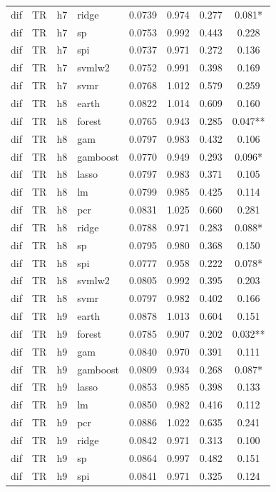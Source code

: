 \begin{ThreePartTable}
\begin{longtable}[t]{llclcccc}
dif & TR & h7 & ridge & 0.0739 & 0.974 & 0.277 & 0.081*\\
dif & TR & h7 & sp & 0.0753 & 0.992 & 0.443 & 0.228\\
dif & TR & h7 & spi & 0.0737 & 0.971 & 0.272 & 0.136\\
dif & TR & h7 & svmlw2 & 0.0752 & 0.991 & 0.398 & 0.169\\
dif & TR & h7 & svmr & 0.0768 & 1.012 & 0.579 & 0.259\\
\addlinespace
dif & TR & h8 & earth & 0.0822 & 1.014 & 0.609 & 0.160\\
dif & TR & h8 & forest & 0.0765 & 0.943 & 0.285 & 0.047**\\
dif & TR & h8 & gam & 0.0797 & 0.983 & 0.432 & 0.106\\
dif & TR & h8 & gamboost & 0.0770 & 0.949 & 0.293 & 0.096*\\
dif & TR & h8 & lasso & 0.0797 & 0.983 & 0.371 & 0.105\\
dif & TR & h8 & lm & 0.0799 & 0.985 & 0.425 & 0.114\\
dif & TR & h8 & pcr & 0.0831 & 1.025 & 0.660 & 0.281\\
dif & TR & h8 & ridge & 0.0788 & 0.971 & 0.283 & 0.088*\\
dif & TR & h8 & sp & 0.0795 & 0.980 & 0.368 & 0.150\\
dif & TR & h8 & spi & 0.0777 & 0.958 & 0.222 & 0.078*\\
dif & TR & h8 & svmlw2 & 0.0805 & 0.992 & 0.395 & 0.203\\
dif & TR & h8 & svmr & 0.0797 & 0.982 & 0.402 & 0.166\\
\addlinespace
dif & TR & h9 & earth & 0.0878 & 1.013 & 0.604 & 0.151\\
dif & TR & h9 & forest & 0.0785 & 0.907 & 0.202 & 0.032**\\
dif & TR & h9 & gam & 0.0840 & 0.970 & 0.391 & 0.111\\
dif & TR & h9 & gamboost & 0.0809 & 0.934 & 0.268 & 0.087*\\
dif & TR & h9 & lasso & 0.0853 & 0.985 & 0.398 & 0.133\\
dif & TR & h9 & lm & 0.0850 & 0.982 & 0.416 & 0.112\\
dif & TR & h9 & pcr & 0.0886 & 1.022 & 0.635 & 0.241\\
dif & TR & h9 & ridge & 0.0842 & 0.971 & 0.313 & 0.100\\
dif & TR & h9 & sp & 0.0864 & 0.997 & 0.482 & 0.151\\
dif & TR & h9 & spi & 0.0841 & 0.971 & 0.325 & 0.124\\

\end{longtable}
\end{ThreePartTable}
